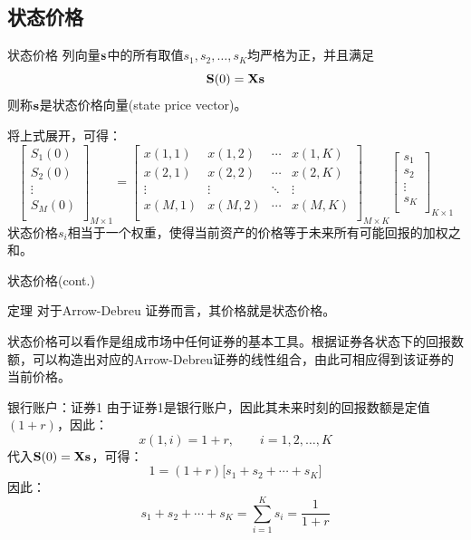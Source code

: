 \documentclass[t]{beamer}
\begin{document}
\subsection{状态价格}
\begin{frame}{状态价格}
列向量${\bf s}$中的所有取值$s_1, s_2, \ldots, s_K$均严格为正，并且满足
\begin{equation*}
{\bf S}(0)={\bf X}{\bf s} 
\end{equation*}
则称${\bf s}$是状态价格向量(state price vector)。     

将上式展开，可得：
\begin{equation*}
\begin{bmatrix}
S_1(0)\\
S_2(0)\\
\vdots\\
S_M(0)\\
\end{bmatrix}_{M\times 1}  =\begin{bmatrix}
x(1,1) & x(1,2)& \cdots & x(1,K)\\
x(2,1) & x(2,2)& \cdots & x(2,K)\\
\vdots & \vdots&\ddots&\vdots\\
x(M,1) & x(M,2)& \cdots & x(M,K)\\
\end{bmatrix}_{M\times K} \begin{bmatrix}
s_1\\
s_2\\
\vdots\\
s_K\\
\end{bmatrix}_{K\times 1} 
\end{equation*}
状态价格$s_i$相当于一个权重，使得当前资产的价格等于未来所有可能回报的{\color{red}加权之和}。
\end{frame}

\begin{frame}{状态价格(cont.)}
\begin{block}{定理}
对于Arrow-Debreu 证券而言，其价格就是状态价格。
\end{block}


状态价格可以看作是组成市场中任何证券的基本工具。根据证券各状态下的回报数额，可以构造出对应的Arrow-Debreu证券的线性组合，由此可相应得到该证券的当前价格。
\end{frame}

\begin{frame}{银行账户：证券1}
由于证券1是银行账户，因此其未来时刻的回报数额是定值$(1+r)$，因此：
\[x(1,i)=1+r, \qquad i=1,2,\ldots,K \]
代入${\bf S}(0)={\bf X}{\bf s} $，可得：
\[1=(1+r)\Big[s_1+s_2+\cdots+s_K \Big] \]
因此：
\[s_1+s_2+\cdots+s_K=\sum_{i=1}^K s_i=\frac{1}{1+r}\]

\end{frame}
\end{document}
